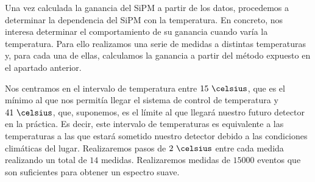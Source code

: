 Una vez calculada la ganancia del SiPM a partir de los  datos, procedemos a determinar la dependencia  del SiPM con la temperatura. En concreto, nos interesa determinar el comportamiento de su ganancia cuando varía la temperatura. Para ello realizamos una serie de medidas a distintas temperaturas y, para cada una de ellas, calculamos la ganancia a partir del método expuesto en el apartado anterior.

Nos centramos en el intervalo de temperatura entre $15~\celsius$, que es el mínimo al que nos permitía llegar el sistema de control de temperatura y $41~\celsius$, que, suponemos, es el límite al que llegará nuestro futuro detector en la práctica. Es decir, este intervalo de temperaturas es equivalente a las temperaturas a las que estará sometido nuestro detector debido a las condiciones climáticas del lugar. Realizaremos pasos de $2~\celsius$ entre cada medida realizando un total de $14$ medidas. Realizaremos medidas de  $15000$ eventos  que son suficientes para obtener un espectro  suave. 

